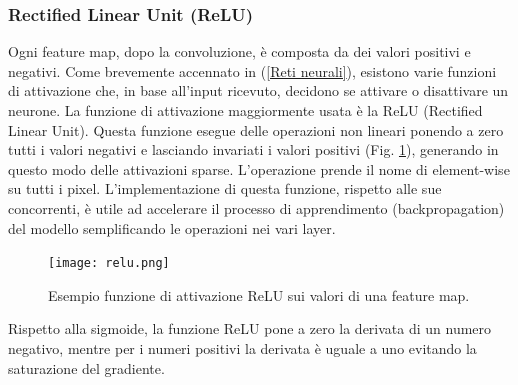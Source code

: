 \subsubsection{Rectified Linear Unit (ReLU)}
Ogni feature map, dopo la convoluzione, è composta da dei valori positivi e negativi. 
Come brevemente accennato in (\ref{Reti neurali}), esistono varie funzioni di attivazione che, in 
base all’input ricevuto, decidono se attivare o disattivare un neurone. La 
funzione di attivazione maggiormente usata è la ReLU (Rectified Linear Unit). 
Questa funzione esegue delle operazioni non lineari ponendo a zero tutti i valori 
negativi e lasciando invariati i valori positivi (Fig. \ref{relu}), generando in questo modo delle 
attivazioni sparse.  L’operazione prende il nome di element-wise su tutti i pixel. 
L’implementazione di questa funzione, rispetto alle sue concorrenti, è utile ad accelerare 
il processo di apprendimento (backpropagation) del modello semplificando 
le operazioni nei vari layer.
\begin{figure}
    \centering
    \texttt{[image: relu.png]}
    \centering
    \caption{Esempio funzione di attivazione ReLU sui valori di una feature map.}
    \label{relu}
\end{figure}
Rispetto alla sigmoide, la funzione ReLU pone a zero la derivata di un numero 
negativo, mentre per i numeri positivi la derivata è uguale a uno evitando la 
saturazione del gradiente.

